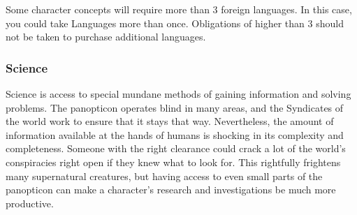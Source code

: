 Some character concepts will require more than 3 foreign languages. In this case, you could take Languages more than once. Obligations of higher than 3 should not be taken to purchase additional languages.

\subsubsection{Science}

\hspace{\parindent} Science is access to special mundane methods of gaining information and solving problems. The panopticon operates blind in many areas, and the Syndicates of the world work to ensure that it stays that way. Nevertheless, the amount of information available at the hands of humans is shocking in its complexity and completeness. Someone with the right clearance could crack a lot of the world's conspiracies right open if they knew what to look for. This rightfully frightens many supernatural creatures, but having access to even small parts of the panopticon can make a character's research and investigations be much more productive.


